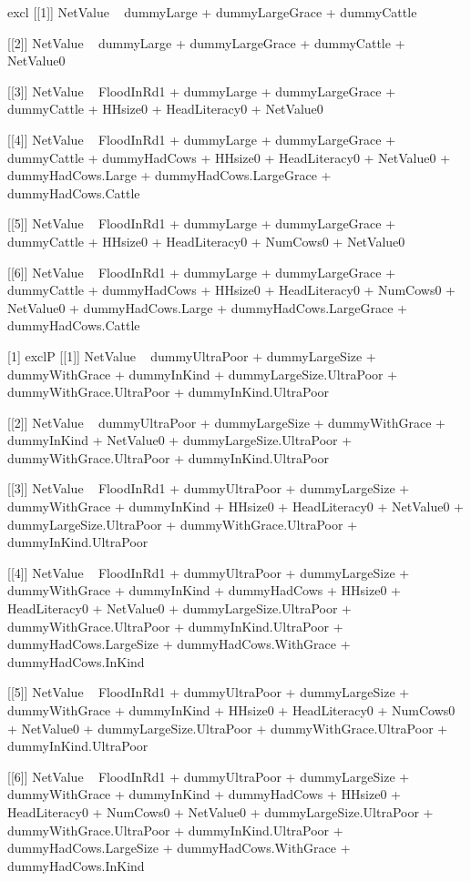 \begin{Schunk}
\begin{Soutput}
[1] excl
[[1]]
NetValue ~ dummyLarge + dummyLargeGrace + dummyCattle

[[2]]
NetValue ~ dummyLarge + dummyLargeGrace + dummyCattle + NetValue0

[[3]]
NetValue ~ FloodInRd1 + dummyLarge + dummyLargeGrace + dummyCattle + 
    HHsize0 + HeadLiteracy0 + NetValue0

[[4]]
NetValue ~ FloodInRd1 + dummyLarge + dummyLargeGrace + dummyCattle + 
    dummyHadCows + HHsize0 + HeadLiteracy0 + NetValue0 + dummyHadCows.Large + 
    dummyHadCows.LargeGrace + dummyHadCows.Cattle

[[5]]
NetValue ~ FloodInRd1 + dummyLarge + dummyLargeGrace + dummyCattle + 
    HHsize0 + HeadLiteracy0 + NumCows0 + NetValue0

[[6]]
NetValue ~ FloodInRd1 + dummyLarge + dummyLargeGrace + dummyCattle + 
    dummyHadCows + HHsize0 + HeadLiteracy0 + NumCows0 + NetValue0 + 
    dummyHadCows.Large + dummyHadCows.LargeGrace + dummyHadCows.Cattle

[1] exclP
[[1]]
NetValue ~ dummyUltraPoor + dummyLargeSize + dummyWithGrace + 
    dummyInKind + dummyLargeSize.UltraPoor + dummyWithGrace.UltraPoor + 
    dummyInKind.UltraPoor

[[2]]
NetValue ~ dummyUltraPoor + dummyLargeSize + dummyWithGrace + 
    dummyInKind + NetValue0 + dummyLargeSize.UltraPoor + dummyWithGrace.UltraPoor + 
    dummyInKind.UltraPoor

[[3]]
NetValue ~ FloodInRd1 + dummyUltraPoor + dummyLargeSize + dummyWithGrace + 
    dummyInKind + HHsize0 + HeadLiteracy0 + NetValue0 + dummyLargeSize.UltraPoor + 
    dummyWithGrace.UltraPoor + dummyInKind.UltraPoor

[[4]]
NetValue ~ FloodInRd1 + dummyUltraPoor + dummyLargeSize + dummyWithGrace + 
    dummyInKind + dummyHadCows + HHsize0 + HeadLiteracy0 + NetValue0 + 
    dummyLargeSize.UltraPoor + dummyWithGrace.UltraPoor + dummyInKind.UltraPoor + 
    dummyHadCows.LargeSize + dummyHadCows.WithGrace + dummyHadCows.InKind

[[5]]
NetValue ~ FloodInRd1 + dummyUltraPoor + dummyLargeSize + dummyWithGrace + 
    dummyInKind + HHsize0 + HeadLiteracy0 + NumCows0 + NetValue0 + 
    dummyLargeSize.UltraPoor + dummyWithGrace.UltraPoor + dummyInKind.UltraPoor

[[6]]
NetValue ~ FloodInRd1 + dummyUltraPoor + dummyLargeSize + dummyWithGrace + 
    dummyInKind + dummyHadCows + HHsize0 + HeadLiteracy0 + NumCows0 + 
    NetValue0 + dummyLargeSize.UltraPoor + dummyWithGrace.UltraPoor + 
    dummyInKind.UltraPoor + dummyHadCows.LargeSize + dummyHadCows.WithGrace + 
    dummyHadCows.InKind


\end{Soutput}
\end{Schunk}
